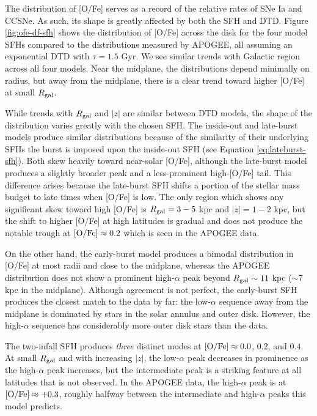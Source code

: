\documentclass[twocolumn,twocolappendix,linenumbers,trackchanges]{aastex631}
\begin{document}
The distribution of [O/Fe] serves as a record of the relative rates of SNe Ia and CCSNe. As such, its shape is greatly affected by both the SFH and DTD. Figure \ref{fig:ofe-df-sfh} shows the distribution of [O/Fe] across the disk for the four model SFHs compared to the distributions measured by APOGEE, all assuming an exponential DTD with $\tau=1.5$ Gyr. We see similar trends with Galactic region across all four models. Near the midplane, the distributions depend minimally on radius, but away from the midplane, there is a clear trend toward higher [O/Fe] at small $R_{\rm gal}$.

While trends with $R_{\rm gal}$ and $|z|$ are similar between DTD models, the shape of the distribution varies greatly with the chosen SFH. The inside-out and late-burst models produce similar distributions because of the similarity of their underlying SFHs \textemdash the burst is imposed upon the inside-out SFH (see Equation \ref{eq:lateburst-sfh}). Both skew heavily toward near-solar [O/Fe], although the late-burst model produces a slightly broader peak and a less-prominent high-[O/Fe] tail. This difference arises because the late-burst SFH shifts a portion of the stellar mass budget to late times when [O/Fe] is low. The only region which shows any significant skew toward high [O/Fe] is $R_{\rm gal}=3-5$ kpc and $|z|=1-2$ kpc, but the shift to higher [O/Fe] at high latitudes is gradual and does not produce the notable trough at ${\rm [O/Fe]}\approx0.2$ which is seen in the APOGEE data. 

On the other hand, the early-burst model produces a bimodal distribution in [O/Fe] at most radii and close to the midplane, whereas the APOGEE distribution does not show a prominent high-$\alpha$ peak beyond $R_{\rm gal}\sim11$ kpc ($\sim7$ kpc in the midplane). 
Although agreement is not perfect, the early-burst SFH produces the closest match to the data by far: the low-$\alpha$ sequence away from the midplane is dominated by stars in the solar annulus and outer disk. However, the high-$\alpha$ sequence has considerably more outer disk stars than the data.

The two-infall SFH produces \textit{three} distinct modes at ${\rm [O/Fe]}\approx 0.0$, $0.2$, and $0.4$. At small $R_{\rm gal}$ and with increasing $|z|$, the low-$\alpha$ peak decreases in prominence as the high-$\alpha$ peak increases, but the intermediate peak is a striking feature at all latitudes that is not observed. In the APOGEE data, the high-$\alpha$ peak is at ${\rm [O/Fe]}\approx+0.3$, roughly halfway between the intermediate and high-$\alpha$ peaks this model predicts.
\end{document}
